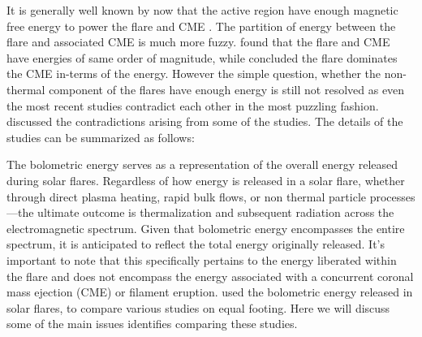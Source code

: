 It is generally well known by now that the active region have enough magnetic free energy to power the flare and CME \citep{emslie12,ash17}. The partition of energy between the flare and associated CME is much more fuzzy. \cite{emslie12} found that the flare and CME have energies of same order of magnitude, while \cite{ash17} concluded the flare dominates the CME in-terms of the energy. However the simple question, whether the non-thermal component of the flares have enough energy is still not resolved as even the most recent studies contradict each other in the most puzzling fashion. \cite{warmuth20} discussed the contradictions arising from some of the studies\citep{stosire07,emslie12,inglis14,warmuth16a,warmuth16b,ash17}. The details of the studies can be summarized as follows:

\begin{table}[ht!]
    \centering
    \caption{The details of the studies.}
    \label{tab1}
\end{table}

The bolometric energy serves as a representation of the overall energy released during solar flares. Regardless of how energy is released in a solar flare, whether through direct plasma heating, rapid bulk flows, or non thermal particle processes—the ultimate outcome is thermalization and subsequent radiation across the electromagnetic spectrum. Given that bolometric energy encompasses the entire spectrum, it is anticipated to reflect the total energy originally released. It's important to note that this specifically pertains to the energy liberated within the flare and does not encompass the energy associated with a concurrent coronal mass ejection (CME) or filament eruption. \cite{warmuth20} used the bolometric energy released in solar flares, to compare various studies on equal footing. Here we will discuss some of the main issues \cite{warmuth20} identifies comparing these studies.

